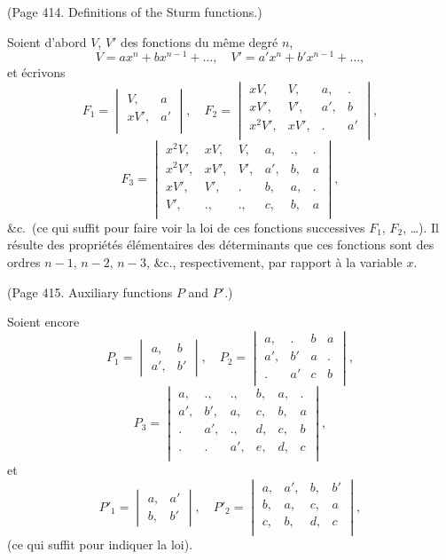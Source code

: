 \documentclass[11pt,a4paper]{book}
\begin{document}
(Page 414. Definitions of the Sturm functions.)

Soient d'abord $V$, $V'$ des fonctions du m\^{e}me degr\'{e} $n$,
\[
V = ax^n + bx^{n-1} + \ldots, \quad V' = a'x^n + b'x^{n-1} + \ldots,
\]
et \'{e}crivons
\[
F_1 =
\begin{vmatrix}
V, & a \\
xV', & a'\\
\end{vmatrix},
\quad
F_2 =
\begin{vmatrix}
xV, & V, & a, & . \\
xV', & V', & a', & b \\
x^2V', & xV', & . & a'\\
\end{vmatrix},
\]
\[
F_3 =
\begin{vmatrix}
x^2V, & xV, & V, & a, & ., & . \\
x^2V', & xV', & V', & a', & b, & a \\
xV', & V', & . & b, & a, & . \\
V', & ., & ., & c, & b, & a\\
\end{vmatrix},
\]
\&c.\ (ce qui suffit pour faire voir la loi de ces fonctions successives $F_1$, $F_2$, \ldots).
Il r\'{e}sulte des propri\'{e}t\'{e}s \'{e}l\'{e}mentaires des d\'{e}terminants que ces fonctions sont des ordres
$n-1$, $n-2$, $n-3$, \&c., respectivement, par rapport \`{a} la variable $x$.

(Page 415. Auxiliary functions $P$ and $P'$.)

Soient encore
\[
P_1 =
\begin{vmatrix}
a, & b \\
a', & b'
\end{vmatrix},
\quad
P_2 =
\begin{vmatrix}
a, & . & b & a \\
a', & b' & a & . \\
. & a' & c & b\\
\end{vmatrix},
\]
\[
P_3 =
\begin{vmatrix}
a, & ., & ., & b, & a, & . \\
a', & b', & a, & c, & b, & a \\
. & a', & ., & d, & c, & b \\
. & . & a', & e, & d, & c\\
\end{vmatrix},
\]
et
\[
P'_1 =
\begin{vmatrix}
a, & a'\\
b, & b'
\end{vmatrix},
\quad
P'_2 =
\begin{vmatrix}
a, & a', & b, & b' \\
b, & a, & c, & a \\
c, & b, & d, & c\\
\end{vmatrix},
\]
(ce qui suffit pour indiquer la loi).
\end{document}
